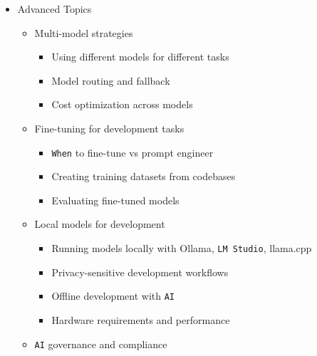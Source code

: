 \documentclass[
]{article}
\providecommand{\tightlist}{%
  \setlength{\itemsep}{0pt}\setlength{\parskip}{0pt}}
\begin{document}
\begin{itemize}
\begin{itemize}
    \begin{itemize}
    \tightlist
    \item
      Automated PR checks with \texttt{AI}
    \item
      Intelligent test selection
    \item
      Deployment risk analysis
    \item
      Automated rollback decisions
    \end{itemize}
  \item
    \texttt{AI} for incident response

    \begin{itemize}
    \tightlist
    \item
      Log analysis and anomaly detection
    \item
      Root cause analysis
    \item
      Remediation suggestion
    \item
      Post-mortem generation
    \end{itemize}
  \end{itemize}
\item
  Advanced Topics

  \begin{itemize}
  \tightlist
  \item
    Multi-model strategies

    \begin{itemize}
    \tightlist
    \item
      Using different models for different tasks
    \item
      Model routing and fallback
    \item
      Cost optimization across models
    \end{itemize}
  \item
    Fine-tuning for development tasks

    \begin{itemize}
    \tightlist
    \item
      \texttt{When} to fine-tune vs prompt engineer
    \item
      Creating training datasets from codebases
    \item
      Evaluating fine-tuned models
    \end{itemize}
  \item
    Local models for development

    \begin{itemize}
    \tightlist
    \item
      Running models locally with Ollama, \texttt{LM\ Studio}, llama.cpp
    \item
      Privacy-sensitive development workflows
    \item
      Offline development with \texttt{AI}
    \item
      Hardware requirements and performance
    \end{itemize}
  \item
    \texttt{AI} governance and compliance


\end{itemize}
\end{itemize}
\end{document}
